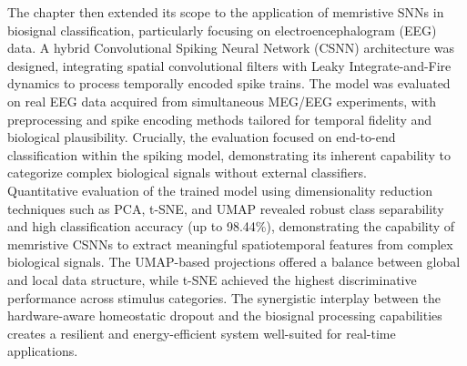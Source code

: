 
\noindent The chapter then extended its scope to the application of memristive SNNs in biosignal classification, particularly focusing on electroencephalogram (EEG) data. A hybrid Convolutional Spiking Neural Network (CSNN) architecture was designed, integrating spatial convolutional filters with Leaky Integrate-and-Fire dynamics to process temporally encoded spike trains. The model was evaluated on real EEG data acquired from simultaneous MEG/EEG experiments, with preprocessing and spike encoding methods tailored for temporal fidelity and biological plausibility. Crucially, the evaluation focused on end-to-end classification within the spiking model, demonstrating its inherent capability to categorize complex biological signals without external classifiers.\\


\noindent Quantitative evaluation of the trained model using dimensionality reduction techniques such as PCA, t-SNE, and UMAP revealed robust class separability and high classification accuracy (up to 98.44\%), demonstrating the capability of memristive CSNNs to extract meaningful spatiotemporal features from complex biological signals. The UMAP-based projections offered a balance between global and local data structure, while t-SNE achieved the highest discriminative performance across stimulus categories. The synergistic interplay between the hardware-aware homeostatic dropout and the biosignal processing capabilities creates a resilient and energy-efficient system well-suited for real-time applications.\\

